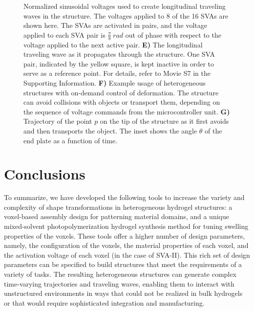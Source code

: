 \begin{figure}[t]
{%
Normalized sinusoidal voltages used to create longitudinal traveling waves in the structure. The voltages applied to 8 of the 16 SVAs are shown here. The SVAs are activated in pairs, and the voltage applied to each SVA pair is $\frac{\pi}{8}~rad$ out of phase with respect to the voltage applied to the next active pair. 
\textbf{E)} The longitudinal traveling wave as it propagates through the structure. One SVA pair, indicated by the yellow square, is kept inactive in order to serve as a reference point. For details, refer to Movie S7 in the Supporting Information. \textbf{F)} Example usage of heterogeneous structures with on-demand control of deformation. The structure can avoid collisions with objects or transport them, depending on the sequence of voltage commands from the microcontroller unit. \textbf{G)} Trajectory of the point $p$ on the tip of the structure as it first avoids and then transports the object. The inset shows the angle $\theta$ of the end plate as a function of time.}
\label{fig:4}
\end{figure}

\section{Conclusions}
To summarize, we have developed the following tools to increase the variety and complexity of shape transformations in heterogeneous hydrogel structures: a voxel-based assembly design for patterning material domains, and a unique mixed-solvent photopolymerization hydrogel synthesis method for tuning swelling properties of the voxels. These tools offer a higher number of design parameters, namely, the configuration of the voxels, the material properties of each voxel, and the activation voltage of each voxel (in the case of SVA-II). This rich set of design parameters can be specified to build structures that meet the requirements of a variety of tasks. The resulting heterogeneous structures can generate complex time-varying trajectories and traveling waves, enabling them to interact with unstructured environments in ways that could not be realized in bulk hydrogels or that would require sophisticated integration and manufacturing.\\

